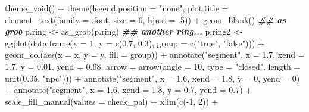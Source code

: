 \documentclass[
]{article}
\newenvironment{Shaded}{\begin{snugshade}}{\end{snugshade}}
\newcommand{\AttributeTok}[1]{\textcolor[rgb]{0.77,0.63,0.00}{#1}}
\newcommand{\DecValTok}[1]{\textcolor[rgb]{0.00,0.00,0.81}{#1}}
\newcommand{\DocumentationTok}[1]{\textcolor[rgb]{0.56,0.35,0.01}{\textbf{\textit{#1}}}}
\newcommand{\FloatTok}[1]{\textcolor[rgb]{0.00,0.00,0.81}{#1}}
\newcommand{\FunctionTok}[1]{\textcolor[rgb]{0.00,0.00,0.00}{#1}}
\newcommand{\NormalTok}[1]{#1}
\newcommand{\OtherTok}[1]{\textcolor[rgb]{0.56,0.35,0.01}{#1}}
\newcommand{\SpecialCharTok}[1]{\textcolor[rgb]{0.00,0.00,0.00}{#1}}
\newcommand{\StringTok}[1]{\textcolor[rgb]{0.31,0.60,0.02}{#1}}
\begin{document}
\begin{Shaded}
\begin{Highlighting}[]
  \FunctionTok{theme\_void}\NormalTok{() }\SpecialCharTok{+}
  \FunctionTok{theme}\NormalTok{(}\AttributeTok{legend.position =} \StringTok{"none"}\NormalTok{,}
    \AttributeTok{plot.title =} \FunctionTok{element\_text}\NormalTok{(}\AttributeTok{family =}\NormalTok{ .font, }\AttributeTok{size =} \DecValTok{6}\NormalTok{, }\AttributeTok{hjust =}\NormalTok{ .}\DecValTok{5}\NormalTok{)) }\SpecialCharTok{+}
  \FunctionTok{geom\_blank}\NormalTok{()}
\DocumentationTok{\#\# as grob}
\NormalTok{p.ring }\OtherTok{\textless{}{-}} \FunctionTok{as\_grob}\NormalTok{(p.ring)}
\DocumentationTok{\#\# another ring...}
\NormalTok{p.ring2 }\OtherTok{\textless{}{-}} \FunctionTok{ggplot}\NormalTok{(}\FunctionTok{data.frame}\NormalTok{(}\AttributeTok{x =} \DecValTok{1}\NormalTok{, }\AttributeTok{y =} \FunctionTok{c}\NormalTok{(}\FloatTok{0.7}\NormalTok{, }\FloatTok{0.3}\NormalTok{), }\AttributeTok{group =} \FunctionTok{c}\NormalTok{(}\StringTok{"true"}\NormalTok{, }\StringTok{"false"}\NormalTok{))) }\SpecialCharTok{+}
  \FunctionTok{geom\_col}\NormalTok{(}\FunctionTok{aes}\NormalTok{(}\AttributeTok{x =}\NormalTok{ x, }\AttributeTok{y =}\NormalTok{ y, }\AttributeTok{fill =}\NormalTok{ group)) }\SpecialCharTok{+}
  \FunctionTok{annotate}\NormalTok{(}\StringTok{"segment"}\NormalTok{, }\AttributeTok{x =} \FloatTok{1.7}\NormalTok{, }\AttributeTok{xend =} \FloatTok{1.7}\NormalTok{, }\AttributeTok{y =} \FloatTok{0.01}\NormalTok{, }\AttributeTok{yend =} \FloatTok{0.68}\NormalTok{,}
    \AttributeTok{arrow =} \FunctionTok{arrow}\NormalTok{(}\AttributeTok{angle =} \DecValTok{10}\NormalTok{, }\AttributeTok{type =} \StringTok{"closed"}\NormalTok{, }\AttributeTok{length =} \FunctionTok{unit}\NormalTok{(}\FloatTok{0.05}\NormalTok{, }\StringTok{"npc"}\NormalTok{))) }\SpecialCharTok{+}
  \FunctionTok{annotate}\NormalTok{(}\StringTok{"segment"}\NormalTok{, }\AttributeTok{x =} \FloatTok{1.6}\NormalTok{, }\AttributeTok{xend =} \FloatTok{1.8}\NormalTok{, }\AttributeTok{y =} \DecValTok{0}\NormalTok{, }\AttributeTok{yend =} \DecValTok{0}\NormalTok{) }\SpecialCharTok{+}
  \FunctionTok{annotate}\NormalTok{(}\StringTok{"segment"}\NormalTok{, }\AttributeTok{x =} \FloatTok{1.6}\NormalTok{, }\AttributeTok{xend =} \FloatTok{1.8}\NormalTok{, }\AttributeTok{y =} \FloatTok{0.7}\NormalTok{, }\AttributeTok{yend =} \FloatTok{0.7}\NormalTok{) }\SpecialCharTok{+}
  \FunctionTok{scale\_fill\_manual}\NormalTok{(}\AttributeTok{values =}\NormalTok{ check\_pal) }\SpecialCharTok{+}
  \FunctionTok{xlim}\NormalTok{(}\FunctionTok{c}\NormalTok{(}\SpecialCharTok{{-}}\DecValTok{1}\NormalTok{, }\DecValTok{2}\NormalTok{)) }\SpecialCharTok{+}

\end{Highlighting}
\end{Shaded}
\end{document}
